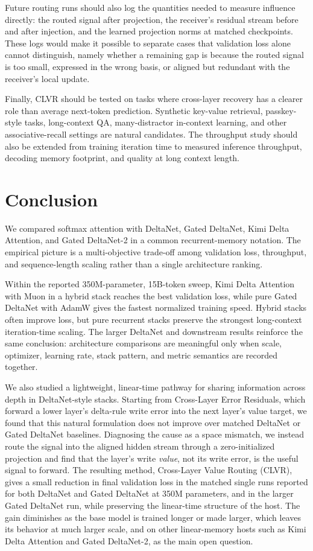 \documentclass{article}
\begin{document}
Future routing runs should also log the quantities needed to measure influence directly: the routed signal after projection, the receiver's residual stream before and after injection, and the learned projection norms at matched checkpoints. These logs would make it possible to separate cases that validation loss alone cannot distinguish, namely whether a remaining gap is because the routed signal is too small, expressed in the wrong basis, or aligned but redundant with the receiver's local update.

Finally, CLVR should be tested on tasks where cross-layer recovery has a clearer role than average next-token prediction. Synthetic key-value retrieval, passkey-style tasks, long-context QA, many-distractor in-context learning, and other associative-recall settings are natural candidates. The throughput study should also be extended from training iteration time to measured inference throughput, decoding memory footprint, and quality at long context length.

\section{Conclusion}

We compared softmax attention with DeltaNet, Gated DeltaNet, Kimi Delta Attention, and Gated DeltaNet-2 in a common recurrent-memory notation. The empirical picture is a multi-objective trade-off among validation loss, throughput, and sequence-length scaling rather than a single architecture ranking.

Within the reported 350M-parameter, 15B-token sweep, Kimi Delta Attention with Muon in a hybrid stack reaches the best validation loss, while pure Gated DeltaNet with AdamW gives the fastest normalized training speed. Hybrid stacks often improve loss, but pure recurrent stacks preserve the strongest long-context iteration-time scaling. The larger DeltaNet and downstream results reinforce the same conclusion: architecture comparisons are meaningful only when scale, optimizer, learning rate, stack pattern, and metric semantics are recorded together.

We also studied a lightweight, linear-time pathway for sharing information across depth in DeltaNet-style stacks. Starting from Cross-Layer Error Residuals, which forward a lower layer's delta-rule write error into the next layer's value target, we found that this natural formulation does not improve over matched DeltaNet or Gated DeltaNet baselines. Diagnosing the cause as a space mismatch, we instead route the signal into the aligned hidden stream through a zero-initialized projection and find that the layer's write \emph{value}, not its write error, is the useful signal to forward. The resulting method, Cross-Layer Value Routing (CLVR), gives a small reduction in final validation loss in the matched single runs reported for both DeltaNet and Gated DeltaNet at 350M parameters, and in the larger Gated DeltaNet run, while preserving the linear-time structure of the host. The gain diminishes as the base model is trained longer or made larger, which leaves its behavior at much larger scale, and on other linear-memory hosts such as Kimi Delta Attention and Gated DeltaNet-2, as the main open question.
\end{document}
